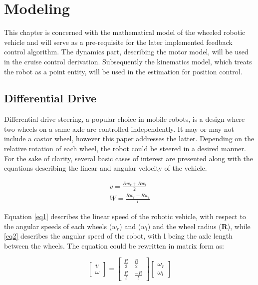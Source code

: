 \chapter{Modeling} \label{ch:modeling}

This chapter is concerned with the mathematical model of the wheeled robotic vehicle and will serve as a pre-requisite for the later implemented feedback control algorithm. 
The dynamics part, describing the motor model, will be used in the cruise control derivation. Subsequently the kinematics model, which treats the robot as a point entity, will be used in the estimation for position control.

\section{Differential Drive} \label{kin_model} 

Differential drive steering, a popular choice in mobile robots, is a design where two wheels on a same axle are controlled independently. It may or may not include a castor wheel, however this paper addresses the latter. Depending on the relative rotation of each wheel, the robot could be steered in a desired manner. For the sake of clarity, several basic cases of interest are presented along with the equations describing the linear and angular velocity of the vehicle. 

\begin{align}
v = \frac{Rw_r + Rw_l}{2} \label{eq1} \\
W = \frac{Rw_r - Rw_l}{l} \label{eq2} 
\end{align}

Equation \ref{eq1} describes the linear speed of the robotic vehicle, with respect to the angular speeds of each wheels (\textbf{$w_r$}) and (\textbf{$w_l$}) and the wheel radius (\textbf{R}), while \ref{eq2} describes the angular speed of the robot, with \textbf{l} being the axle length between the wheels. 
The equation could be rewritten in matrix form as:

\[  	
\begin{bmatrix}
	v \\
	\omega	
\end{bmatrix} 
=
\begin{bmatrix} 
	\frac{R}{2} & \frac{R}{2} \\
	\frac{R}{l} & \frac{-R}{l} 
\end{bmatrix}
\begin{bmatrix}
	\omega_r \\
	\omega_l
\end{bmatrix} \label{eq3} 	
\] 

